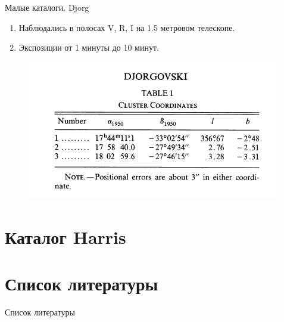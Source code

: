 \documentclass{beamer}
\begin{document}
    \begin{frame}{Малые каталоги. Djorg}
        \begin{enumerate}[]
            \item Наблюдались в полосах V, R, I на 1.5 метровом телескопе.
            \item Экспозиции от 1 минуты до 10 минут.
        \end{enumerate}
        \begin{figure}[h]
            \centering
            \includegraphics[width=0.7\linewidth]{pictures/Djorg.jpg}
        \end{figure}
    \end{frame}
    \section{Каталог Harris}
    \section{Список литературы}
    \begin{frame}[t, allowframebreaks]{Список литературы}
        
        
    \end{frame}
\end{document}
